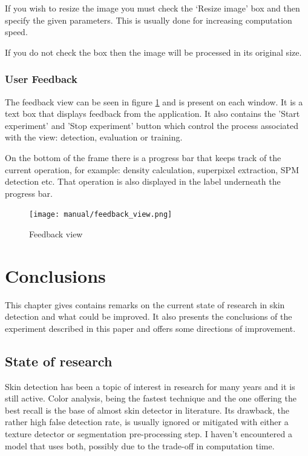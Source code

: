 \documentclass[12pt]{report}
\begin{document}
	If you wish to resize the image you must check the ‘Resize image’ box and then specify the given parameters. This is usually done for increasing computation speed.
	
	If you do not check the box then the image will be processed in its original size.
	
	\subsection{User Feedback}
	
	The feedback view can be seen in figure \ref{feedback_view} and is present on each window. It is a text box that displays feedback from the application. It also contains the 'Start experiment' and 'Stop experiment' button which control the process associated with the view: detection, evaluation or training.
	
	On the bottom of the frame there is a progress bar that keeps track of the current operation, for example: density calculation, superpixel extraction, SPM detection etc. That operation is also displayed in the label underneath the progress bar.
	
	
	\begin{figure}[h!]
		\centering
		\texttt{[image: manual/feedback\_view.png]}
		\caption{Feedback view}
		\label{feedback_view}
	\end{figure}

	\chapter{Conclusions}
	This chapter gives contains remarks on the current state of research in skin detection and what could be improved. It also presents the conclusions of the experiment described in this paper and offers some directions of improvement.
	
	\section{State of research}
	Skin detection has been a topic of interest in research for many years and it is still active. Color analysis, being the fastest technique and the one offering the best recall is the base of almost skin detector in literature. Its drawback, the rather high false detection rate, is usually ignored or mitigated with either a texture detector or segmentation pre-processing step. I haven't encountered a model that uses both, possibly due to the trade-off in computation time.
	
\end{document}
